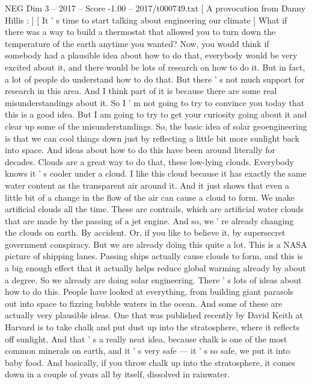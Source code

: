 \begin{textsample}{NEG Dim 3 – 2017 – Score -1.00 – 2017/t000749.txt}  \label{ex:f3_neg_072}
[ A provocation from Danny Hillis : ] [ It ' s time to start talking about engineering our climate ] What if there was a way to build a thermostat that allowed you to turn down the temperature of the earth anytime you wanted?
Now, you would think if somebody had a plausible idea about how to do that, everybody would be very excited about it, and there would be lots of research on how to do it.
But in fact, a lot of people do understand how to do that.
But there ' s not much support for research in this area.
And I think part of it is because there are some real misunderstandings about it.
So I ' m not going to try to convince you today that this is a good idea.
But I am going to try to get your curiosity going about it and clear up some of the misunderstandings.
So, the basic idea of solar geoengineering is that we can cool things down just by reflecting a little bit more sunlight back into space.
And ideas about how to do this have been around literally for decades.
Clouds are a great way to do that, these low-lying clouds.
Everybody knows it ' s cooler under a cloud.
I like this cloud because it has exactly the same water content as the transparent air around it.
And it just shows that even a little bit of a change in the flow of the air can cause a cloud to form.
We make artificial clouds all the time.
These are contrails, which are artificial water clouds that are made by the passing of a jet engine.
And so, we ' re already changing the clouds on earth.
By accident.
Or, if you like to believe it, by supersecret government conspiracy.
But we are already doing this quite a lot.
This is a NASA picture of shipping lanes.
Passing ships actually cause clouds to form, and this is a big enough effect that it actually helps reduce global warming already by about a degree.
So we already are doing solar engineering.
There ' s lots of ideas about how to do this.
People have looked at everything, from building giant parasols out into space to fizzing bubble waters in the ocean.
And some of these are actually very plausible ideas.
One that was published recently by David Keith at Harvard is to take chalk and put dust up into the stratosphere, where it reflects off sunlight.
And that ' s a really neat idea, because chalk is one of the most common minerals on earth, and it ' s very safe — it ' s so safe, we put it into baby food.
And basically, if you throw chalk up into the stratosphere, it comes down in a couple of years all by itself, dissolved in rainwater.

\end{textsample}
